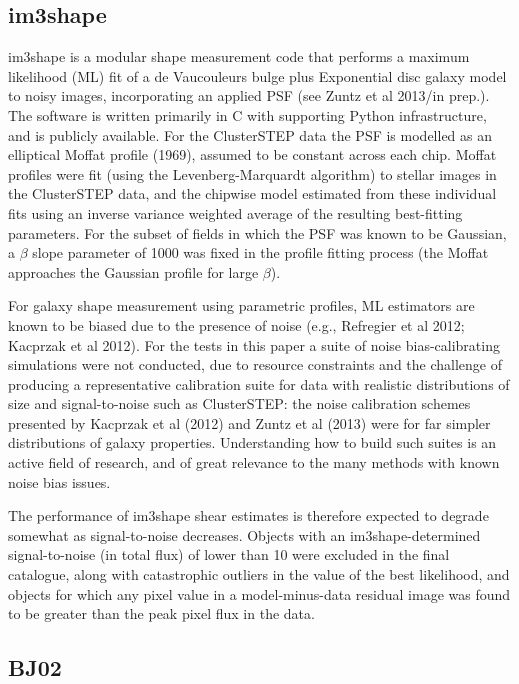 \subsection{im3shape}
im3shape is a modular shape measurement code that performs a maximum likelihood (ML) fit of a de Vaucouleurs bulge plus Exponential disc galaxy model to noisy images, incorporating an applied PSF (see Zuntz et al 2013/in prep.).  The software is written primarily in C with supporting Python infrastructure, and is publicly available.  For the ClusterSTEP data the PSF is modelled as an elliptical Moffat profile (1969), assumed to be constant across each chip.  Moffat profiles were fit (using the Levenberg-Marquardt algorithm) to stellar images in the ClusterSTEP data, and the chipwise model estimated from these individual fits using an inverse variance weighted average of the resulting best-fitting parameters. For the subset of fields in which the PSF was known to be Gaussian, a $\beta$ slope parameter of 1000 was fixed in the profile fitting process (the Moffat approaches the Gaussian profile for large $\beta$).

For galaxy shape measurement using parametric profiles, ML estimators are known to be biased due to the presence of noise (e.g., Refregier et al 2012; Kacprzak et al 2012).  For the tests in this paper a suite of noise bias-calibrating simulations were not conducted, due to resource constraints and the challenge of producing a representative calibration suite for data with realistic distributions of size and signal-to-noise such as ClusterSTEP:  the noise calibration schemes presented by Kacprzak et al (2012) and Zuntz et al (2013) were for far simpler distributions of galaxy properties.  Understanding how to build such suites is an active field of research, and of great relevance to the many methods with known noise bias issues.

The performance of im3shape shear estimates is therefore expected to degrade somewhat as signal-to-noise decreases.  Objects with an im3shape-determined signal-to-noise (in total flux) of lower than 10 were excluded in the final catalogue, along with catastrophic outliers in the value of the best likelihood, and objects for which any pixel value in a model-minus-data residual image was found to be greater than the peak pixel flux in the data.

\subsection{BJ02}


